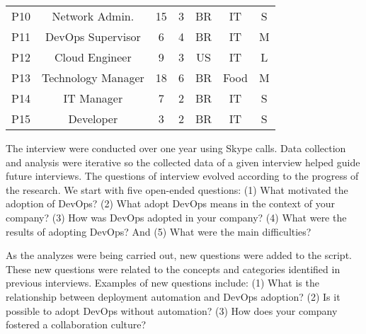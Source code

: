 \begin{table}[t]
\begin{tabular}{ccccccc}
P10                  & Network Admin.        & 15           & 3           & BR            & IT                 & S                               \\

P11                  & DevOps Supervisor                & 6            & 4           & BR            & IT                  & M                               \\

P12                  & Cloud Engineer              & 9            & 3           & US            & IT                  & L                               \\

P13                  & Technology Manager                 & 18            & 6           & BR            & Food                  & M                               \\

P14                  & IT Manager            & 7            & 2           & BR            & IT                  & S                               \\

P15                  & Developer        & 3            & 2           & BR            & IT                  & S \\ \bottomrule
\end{tabular}
\end{table}



The interview were conducted over one year using Skype calls.
Data collection and analysis were iterative so the collected data of a given interview helped guide
future interviews. The questions of interview evolved according to
the progress of the research. We start with five open-ended questions: (1) What
motivated the adoption of DevOps? (2) What adopt DevOps means in the context of
your company? (3) How was DevOps adopted in your company? (4) What were the
results of adopting DevOps? And (5) What were the main difficulties?

As the analyzes were being carried out, new questions were added to the script.
These new questions were related to the concepts and categories identified in
previous interviews. Examples of new questions include: (1) What is the
relationship between deployment automation and DevOps adoption? (2) Is it
possible to adopt DevOps without automation? (3) How does your company fostered a collaboration
culture?

